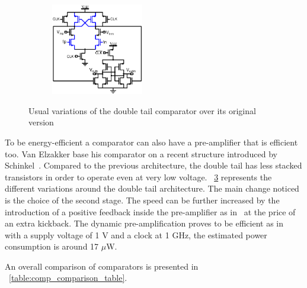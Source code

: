 \begin{figure}[htp]
\begin{subfigure}[b]{0.48\textwidth}
        \label{fig:dbl_tail_chan}
    \end{subfigure}
    \begin{subfigure}[b]{0.48\textwidth}
        \centering
        \includegraphics[height=4cm]{Chapter7/Figs/dbl_tail_babayan.ps}
        \label{fig:dbl_tail_babayan}
    \end{subfigure}
	\caption{Usual variations of the double tail comparator over its original version}
	\label{fig:dbl_tail_comp}
\end{figure}

To be energy-efficient a comparator can also have a pre-amplifier that is efficient too. Van Elzakker base his comparator on a recent structure introduced by Schinkel~\cite{Schinkel2007, Elzakker2010}. Compared to the previous architecture, the double tail has less stacked transistors in order to operate even at very low voltage. \figurename~\ref{fig:dbl_tail_comp} represents the different variations around the double tail architecture. The main change noticed is the choice of the second stage. The speed can be further increased by the introduction of a positive feedback inside the pre-amplifier as in~\cite{Bult1997,Babayan2014} at the price of an extra kickback. The dynamic pre-amplification proves to be efficient as in~\cite{Savani2015} with a supply voltage of 1 V and a clock at 1 GHz, the estimated power consumption is around 17 \(\mu \)W.

An overall comparison of comparators is presented in \tablename~\ref{table:comp_comparison_table}.

